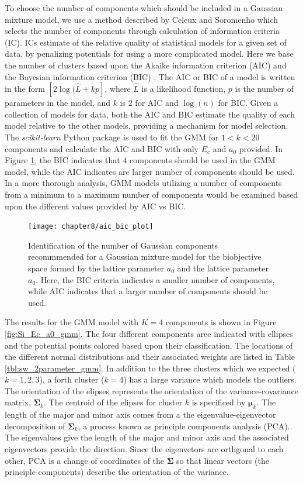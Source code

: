 To choose the number of components which should be included in a Gaussian mixture model, we use a method described by Celeux and Soromenho\cite{celeux1996_gmm_components} which selects the number of components through calculation of information criteria (IC).  ICs estimate of the relative quality of statistical models for a given set of data, by penalizing potentials for using a more complicated model.
Here we base the number of clusters based upon the Akaike information criterion (AIC)\cite{akaike1998_aic} and the Bayesian information criterion (BIC) \cite{schwarz1978_bic}.
The AIC or BIC of a model is written in the form $[2\log(\hat{L}+kp]$, where $\hat{L}$ is a likelihood function, $p$ is the number of parameters in the model, and $k$ is $2$ for AIC and $\log(n)$ for BIC.
Given a collection of models for data, both the AIC and BIC estimate the quality of each model relative to the other models, providing a mechanism for model selection.
The \emph{scikit-learn} Python package\cite{pedregosa2011_scikitlearn} is used to fit the GMM for $1 < k < 20$ components and calculate the AIC and BIC with only $E_c$ and $a_0$ provided.
In Figure \ref{fig:Si_Ec_a0_aic_bic}, the BIC indicates that $4$ components should be used in the GMM model, while the AIC indicates are larger number of components should be used.
In a more thorough analysis, GMM models utilizing a number of components from a minimum to a maximum number of components would be examined based upon the different values provided by AIC vs BIC.
\begin{figure}[ht]
	\centering
	\texttt{[image: chapter8/aic\_bic\_plot]}
	\caption{Identification of the number of Gaussian components recommmended for a Gaussian mixture model for the biobjective space formed by the lattice parameter $a_0$ and the lattice parameter $a_0$.  Here, the BIC criteria indicates a smaller number of components, while AIC indicates that a larger number of components should be used.}
	\label{fig:Si_Ec_a0_aic_bic}
\end{figure}

The results for the GMM model with $K=4$ components is shown in Figure \ref{fig:Si_Ec_a0_gmm}.  The four different components aree indicated with ellipses and the potential points colored based upon their classification.  The locations of the different normal distributions and their associated weights are listed in Table \ref{tbl:sw_2parameter_gmm}.  In addition to the three clusters which we expected ($k=1,2,3$), a forth cluster ($k=4$) has a large variance which models the outliers.  The orientation of the elipses represents the orientation of the variance-covariance matrix, $\bm{\Sigma}_k$.
The centroid of the elipses for cluster $k$ is specificed by $\bm{\mu}_k$.  The length of the major and minor axis comes from a the eigenvalue-eigenvector decomposition of $\bm{\Sigma}_k$, a process known as principle components analysis (PCA).\cite{pearson1901_pca,hotelling1933_pca}.  The eigenvalues give the length of the major and minor axis and the associated eigenvectors provide the direction.  Since the eigenvetors are orthgonal to each other, PCA is a change of coordinates of the $\bm{\Sigma}$ so that linear vectors (the principle components) describe the orientation of the variance.

